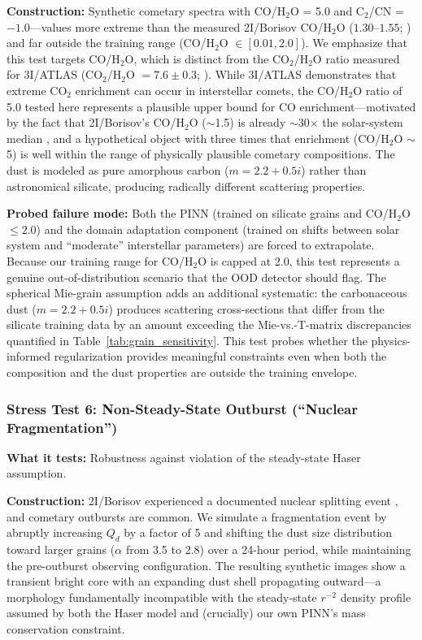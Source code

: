 \documentclass[usenatbib]{mnras}
\begin{document}
\textbf{Construction:} Synthetic cometary spectra with CO/H$_2$O = 5.0 and C$_2$/CN = $-1.0$---values more extreme than the measured 2I/Borisov CO/H$_2$O ($1.30$--$1.55$; \citealt{bodewits20}) and far outside the training range (CO/H$_2$O $\in [0.01, 2.0]$). We emphasize that this test targets CO/H$_2$O, which is distinct from the CO$_2$/H$_2$O ratio measured for 3I/ATLAS (CO$_2$/H$_2$O $= 7.6 \pm 0.3$; \citealt{cordiner25}). While 3I/ATLAS demonstrates that extreme CO$_2$ enrichment can occur in interstellar comets, the CO/H$_2$O ratio of 5.0 tested here represents a plausible upper bound for CO enrichment---motivated by the fact that 2I/Borisov's CO/H$_2$O ($\sim$1.5) is already $\sim$30$\times$ the solar-system median \citep{bockelee04}, and a hypothetical object with three times that enrichment (CO/H$_2$O $\sim$ 5) is well within the range of physically plausible cometary compositions. The dust is modeled as pure amorphous carbon ($m = 2.2 + 0.5i$) rather than astronomical silicate, producing radically different scattering properties.

\textbf{Probed failure mode:} Both the PINN (trained on silicate grains and CO/H$_2$O $\leq 2.0$) and the domain adaptation component (trained on shifts between solar system and ``moderate'' interstellar parameters) are forced to extrapolate. Because our training range for CO/H$_2$O is capped at 2.0, this test represents a genuine out-of-distribution scenario that the OOD detector should flag. The spherical Mie-grain assumption adds an additional systematic: the carbonaceous dust ($m = 2.2 + 0.5i$) produces scattering cross-sections that differ from the silicate training data by an amount exceeding the Mie-vs.-T-matrix discrepancies quantified in Table~\ref{tab:grain_sensitivity}. This test probes whether the physics-informed regularization provides meaningful constraints even when both the composition and the dust properties are outside the training envelope.

\subsubsection{Stress Test 6: Non-Steady-State Outburst (``Nuclear Fragmentation'')}

\textbf{What it tests:} Robustness against violation of the steady-state Haser assumption.

\textbf{Construction:} 2I/Borisov experienced a documented nuclear splitting event \citep{jewitt20}, and cometary outbursts are common. We simulate a fragmentation event by abruptly increasing $Q_d$ by a factor of 5 and shifting the dust size distribution toward larger grains ($\alpha$ from 3.5 to 2.8) over a 24-hour period, while maintaining the pre-outburst observing configuration. The resulting synthetic images show a transient bright core with an expanding dust shell propagating outward---a morphology fundamentally incompatible with the steady-state $r^{-2}$ density profile assumed by both the Haser model and (crucially) our own PINN's mass conservation constraint.
\end{document}
